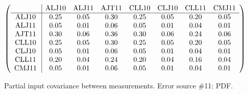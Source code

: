 \begin{table}[H]
\scriptsize
\begin{center}
\renewcommand{\arraystretch}{1.1}
\begin{math}\left(\begin{array}{c|ccccccc}
 & \mathrm{ALJ10} & 
\mathrm{ALJ11} & 
\mathrm{AJT11} & 
\mathrm{CLL10} & 
\mathrm{CLJ10} & 
\mathrm{CLL11} & 
\mathrm{CMJ11} \\
\hline
\mathrm{ALJ10} \hspace*{2pt} &       0.25 &       0.05 &       0.30 &       0.25 &       0.05 &       0.20 &       0.05 \\
\mathrm{ALJ11} \hspace*{2pt} &       0.05 &       0.01 &       0.06 &       0.05 &       0.01 &       0.04 &       0.01 \\
\mathrm{AJT11} \hspace*{2pt} &       0.30 &       0.06 &       0.36 &       0.30 &       0.06 &       0.24 &       0.06 \\
\mathrm{CLL10} \hspace*{2pt} &       0.25 &       0.05 &       0.30 &       0.25 &       0.05 &       0.20 &       0.05 \\
\mathrm{CLJ10} \hspace*{2pt} &       0.05 &       0.01 &       0.06 &       0.05 &       0.01 &       0.04 &       0.01 \\
\mathrm{CLL11} \hspace*{2pt} &       0.20 &       0.04 &       0.24 &       0.20 &       0.04 &       0.16 &       0.04 \\
\mathrm{CMJ11} \hspace*{2pt} &       0.05 &       0.01 &       0.06 &       0.05 &       0.01 &       0.04 &       0.01 \\
\end{array}\right)\end{math}
\caption{Partial input covariance between measurements. Error source \#11: PDF.}
\renewcommand{\arraystretch}{1}
\end{center}
\end{table}

